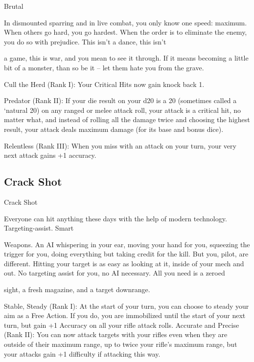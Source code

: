                                                       Brutal  

In dismounted sparring and in live combat, you only know one speed: maximum. When others go hard, you  
go hardest. When the order is to eliminate the enemy, you do so with prejudice. This isn’t a dance, this isn’t  

a game, this is war, and you mean to see it through. If it means becoming a little bit of a monster, than so  
be it -- let them hate you from the grave.   

                                                                                                                  


Cull the Herd (Rank I): Your Critical Hits now gain knock back 1.
 
Predator (Rank II): If your die result on your d20 is a 20 (sometimes called a ‘natural 20) on any  
ranged or melee attack roll, your attack is a critical hit, no matter what, and instead of rolling all  
the damage twice and choosing the highest result, your attack deals maximum damage (for its  
base and bonus dice).
 
Relentless (Rank III): When you miss with an attack on your turn, your very next attack gains +1  
accuracy.
 
\subsection{Crack Shot}

                                                   Crack Shot  

Everyone can hit anything these days with the help of modern technology. Targeting-assist. Smart  

Weapons. An AI whispering in your ear, moving your hand for you, squeezing the trigger for you, doing  
everything but taking credit for the kill. But you, pilot, are different. Hitting your target is as easy as looking  
at it, inside of your mech and out. No targeting assist for you, no AI necessary. All you need is a zeroed  

sight, a fresh magazine, and a target downrange.   

Stable, Steady (Rank I): At the start of your turn, you can choose to steady your aim as a Free  
Action. If you do, you are immobilized until the start of your next turn, but gain +1 Accuracy on all  
your rifle attack rolls.  
Accurate and Precise (Rank II): You can now attack targets with your rifles even when they are  
outside of their maximum range, up to twice your rifle’s maximum range, but your attacks gain  
+1 difficulty if attacking this way.
 
